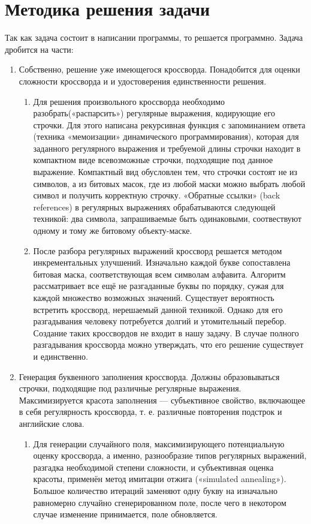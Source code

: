 \documentclass[12pt]{article}
\begin{document}
    \newpage %

\section{Методика решения задачи}
Так как задача состоит в написании программы, то решается программно. Задача дробится на части: 
\begin{enumerate} 
\item Собственно, решение уже имеющегося кроссворда. Понадобится для оценки сложности кроссворда и и удостоверения единственности решения.

\begin{enumerate} 
\item Для решения произвольного кроссворда необходимо разобрать(«распарсить») регулярные выражения, кодирующие его строчки. Для этого написана рекурсивная функция с запоминанием ответа (техника «мемоизации» динамического программирования), которая для заданного регулярного выражения и требуемой длины строчки находит в компактном виде всевозможные строчки, подходящие под данное выражение. Компактный вид обусловлен тем, что строчки состоят не из символов, а из битовых масок, где из любой маски можно выбрать любой символ и получить корректную строчку. «Обратные ссылки» (back references) в регулярных выражениях обрабатываются следующей техникой: два символа, запрашиваемые быть одинаковыми, соотвествуют одному и тому же битовому объекту-маске.
\item После разбора регулярных выражений кроссворд решается методом инкрементальных улучшений. Изначально каждой букве сопоставлена битовая маска, соответствующая всем символам алфавита. Алгоритм рассматривает все ещё не разгаданные буквы по порядку, сужая для каждой множество возможных значений. Существует вероятность встретить кроссворд, нерешаемый данной техникой. Однако для его разгадывания человеку потребуется долгий и утомительный перебор. Создание таких кроссвордов не входит в нашу задачу. В случае полного разгадывания кроссворда можно утверждать, что его решение существует и единственно.
\end{enumerate} 

\newpage

\item Генерация буквенного заполнения кроссворда. Должны образовываться строчки, подходящие под различные регулярные выражения. Максимизируется красота заполнения — субъективное свойство, включающее в себя регулярность кроссворда, т. е. различные повторения подстрок и английские слова.
\begin{enumerate} 
\item Для генерации случайного поля, максимизирующего потенциальную оценку кроссворда, а именно, разнообразие типов регулярных выражений, разгадка необходимой степени сложности, и субъективная оценка красоты, применён метод имитации отжига («simulated annealing»). Большое количество итераций заменяют одну букву на изначально равномерно случайно сгенерированном поле, после чего в некотором случае изменение принимается, поле обновляется.
\end{enumerate} 


\end{enumerate}
\end{document}
